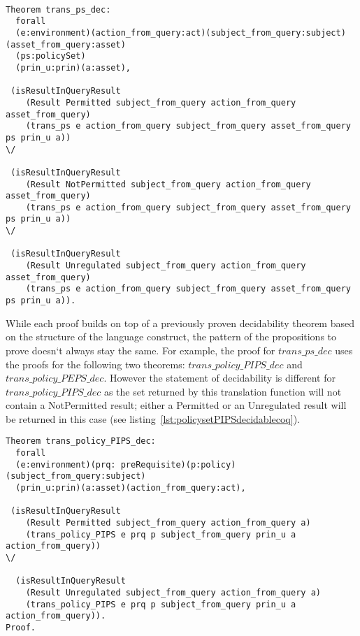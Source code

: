 \begin{lstlisting}

Theorem trans_ps_dec:
  forall
  (e:environment)(action_from_query:act)(subject_from_query:subject)(asset_from_query:asset)
  (ps:policySet)
  (prin_u:prin)(a:asset),

 (isResultInQueryResult 
    (Result Permitted subject_from_query action_from_query asset_from_query)
    (trans_ps e action_from_query subject_from_query asset_from_query ps prin_u a)) 
\/

 (isResultInQueryResult 
    (Result NotPermitted subject_from_query action_from_query asset_from_query)
    (trans_ps e action_from_query subject_from_query asset_from_query ps prin_u a)) 
\/

 (isResultInQueryResult 
    (Result Unregulated subject_from_query action_from_query asset_from_query)
    (trans_ps e action_from_query subject_from_query asset_from_query ps prin_u a)).

\end{lstlisting}


While each proof builds on top of a previously proven decidability theorem based on the structure of the language construct, the pattern of the propositions to prove doesn`t always stay the same. For example, the proof for $trans\_ps\_dec$ uses the proofs for the following two theorems: $trans\_policy\_PIPS\_dec$ and $trans\_policy\_PEPS\_dec$. However the statement of decidability is different for $trans\_policy\_PIPS\_dec$ as the set returned by this translation function will not contain a NotPermitted result; either a Permitted or an Unregulated result will be returned in this case (see listing~\ref{lst:policysetPIPSdecidablecoq}).

\begin{lstlisting}
Theorem trans_policy_PIPS_dec:
  forall
  (e:environment)(prq: preRequisite)(p:policy)(subject_from_query:subject)
  (prin_u:prin)(a:asset)(action_from_query:act),

 (isResultInQueryResult
    (Result Permitted subject_from_query action_from_query a)
    (trans_policy_PIPS e prq p subject_from_query prin_u a action_from_query))
\/

  (isResultInQueryResult
    (Result Unregulated subject_from_query action_from_query a)
    (trans_policy_PIPS e prq p subject_from_query prin_u a action_from_query)).
Proof.

\end{lstlisting}















